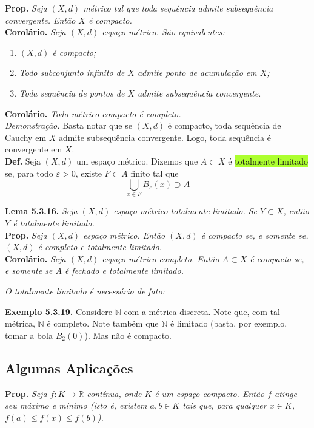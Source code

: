 \documentclass{article}
\begin{document}
\begin{landscape}
\begin{multicols}{3}
\textbf{Prop.} \textit{Seja $(X,d)$ métrico tal que toda sequência admite subsequência convergente. Então $X$ é compacto.}\\

\textbf{Corolário.} \textit{Seja $(X,d)$ espaço métrico. São equivalentes:}
\begin{enumerate}
    \item \textit{$(X,d)$ é compacto;}
    \item \textit{Todo subconjunto infinito de $X$ admite ponto de acumulação em $X$;}
    \item \textit{Toda sequência de pontos de $X$ admite subsequência convergente.}
\end{enumerate}
\textbf{Corolário.} \textit{Todo métrico compacto é completo.}\\
\textit{Demonstração.} Basta notar que se $(X,d)$ é compacto, toda sequência de Cauchy em $X$ admite subsequência convergente. Logo, toda sequência é convergente em $X$.\\

\textbf{Def.} Seja $(X, d)$ um espaço métrico. Dizemos que $A \subset X$ é  \colorbox{GreenYellow}{totalmente limitado} se, para todo $\varepsilon > 0$, existe $F \subset A$ finito tal que
\[
\bigcup_{x \in F} B_\varepsilon(x) \supset A
\]

\textbf{Lema 5.3.16.} \textit{Seja $(X, d)$ espaço métrico totalmente limitado. Se $Y \subset X$, então $Y$ é totalmente limitado.}\\

\textbf{Prop.} \textit{Seja $(X, d)$ espaço métrico. Então $(X, d)$ é compacto se, e somente se, $(X, d)$ é completo e totalmente limitado.}\\

\textbf{Corolário.} \textit{Seja $(X, d)$ espaço métrico completo. Então $A \subset X$ é compacto se, e somente se $A$ é fechado e totalmente limitado.}

\textit{O totalmente limitado é necessário de fato:}

\textbf{Exemplo 5.3.19.} Considere $\mathbb{N}$ com a métrica discreta. Note que, com tal métrica, $\mathbb{N}$ é completo. Note também que $\mathbb{N}$ é limitado (basta, por exemplo, tomar a bola $B_2(0)$). Mas não é compacto.

\subsection{Algumas Aplicações}

\textbf{Prop.} \textit{Seja $f : K \to \mathbb{R}$ contínua, onde $K$ é um espaço compacto. Então $f$ atinge seu máximo e mínimo (\textit{isto é}, existem $a, b \in K$ tais que, para qualquer $x \in K$, $f(a) \leq f(x) \leq f(b)$).}\\


\end{multicols}
\end{landscape}
\end{document}
